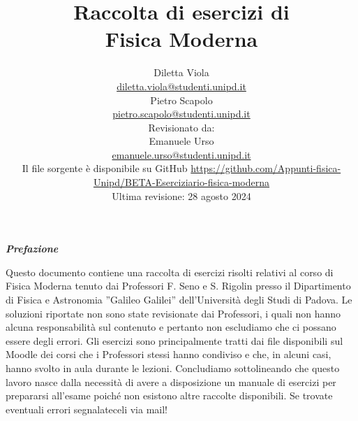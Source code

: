 \documentclass[12pt,twoside,a4]{article}
\begin{document}
\setlength{\headheight}{15.2pt}

\title{Raccolta di esercizi di \\Fisica Moderna}
\author{Diletta Viola \\ \small{\href{mailto:\\ diletta.viola@studenti.unipd.it}{diletta.viola@studenti.unipd.it}}\\
\Large Pietro Scapolo \\ \small{\href{mailto:\\ pietro.scapolo@studenti.unipd.it}{pietro.scapolo@studenti.unipd.it}}\\
\vspace*{5em}
\small{Revisionato da:} \\
\Large Emanuele Urso \\ \small{\href{mailto:\\ emanuele.urso@studenti.unipd.it}{emanuele.urso@studenti.unipd.it}  \\
\vspace*{5em}
Il file sorgente è disponibile su GitHub \url{https://github.com/Appunti-fisica-Unipd/BETA-Eserciziario-fisica-moderna} \\
Ultima revisione: 28 agosto 2024
}}

\maketitle[toc=off]
\pagestyle{empty}
\vspace*{\fill} 
\begin{center}
    \textit{\textbf{ \Large Prefazione}}
\end{center}
    \begin{adjustwidth}{0.1\textwidth}{0.1\textwidth}
    \begin{center}
    Questo documento contiene una raccolta di esercizi risolti relativi al corso di Fisica Moderna tenuto dai Professori F. Seno e S. Rigolin presso il Dipartimento di Fisica e Astronomia ”Galileo Galilei” dell'Università degli Studi di Padova. Le soluzioni riportate non sono state revisionate dai Professori, i quali non hanno alcuna responsabilità sul contenuto e pertanto non escludiamo che ci possano essere degli errori. Gli esercizi sono principalmente tratti dai file disponibili sul Moodle dei corsi che i Professori stessi hanno condiviso e che, in alcuni casi, hanno svolto in aula durante le lezioni. 
    Concludiamo sottolineando che questo lavoro nasce dalla necessità di avere a disposizione un manuale di esercizi per prepararsi all'esame poiché non esistono altre raccolte disponibili.
    Se trovate eventuali errori segnalateceli via mail!
    \end{center}
    \end{adjustwidth}
    
\end{document}
